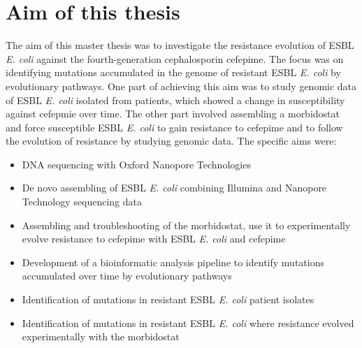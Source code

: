 \chapter{Aim of this thesis}
The aim of this master thesis was to investigate the resistance evolution of ESBL \textit{E. coli} against the fourth-generation cephalosporin cefepime. The focus was on identifying mutations accumulated in the genome of resistant ESBL \textit{E. coli} by evolutionary pathways. One part of achieving this aim was to study genomic data of ESBL \textit{E. coli} isolated from patients, which showed a change in susceptibility against cefepmie over time. The other part involved assembling a morbidostat and force susceptible ESBL \textit{E. coli} to gain resistance to cefepime and to follow the evolution of resistance by studying genomic data. The specific aims were:
\begin{itemize}
	\item DNA sequencing with Oxford Nanopore Technologies
	\item De novo assembling of ESBL \textit{E. coli} combining Illumina and Nanopore Technology sequencing data
	\item Assembling and troubleshooting of the morbidostat, use it to experimentally evolve resistance to cefepime with ESBL \textit{E. coli} and cefepime
	\item Development of a bioinformatic analysis pipeline to identify mutations accumulated over time by evolutionary pathways
	\item Identification of mutations in resistant ESBL \textit{E. coli} patient isolates
	\item Identification of mutations in resistant ESBL \textit{E. coli} where resistance evolved experimentally with the morbidostat
\end{itemize}  